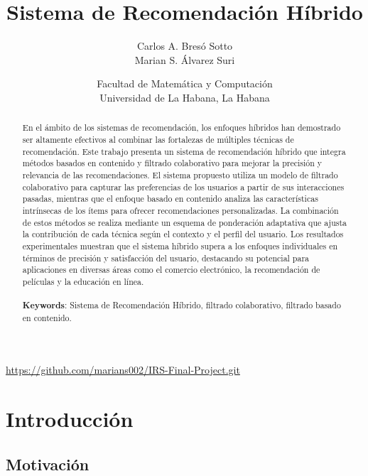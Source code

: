 \documentclass[a4paper,12pt]{report}
\begin{document}
\title{Sistema de Recomendación Híbrido}
\author{Carlos A. Bresó Sotto \\
Marian S. Álvarez Suri}

\urldef{\repo}\url{https://github.com/marians002/IRS-Final-Project.git}

\date{Facultad de Matemática y Computación \\ 
           Universidad de La Habana, La Habana 
           \\ \repo}

\maketitle

\begin{abstract}
    En el ámbito de los sistemas de recomendación, los enfoques híbridos han demostrado ser altamente efectivos al combinar las fortalezas de múltiples técnicas de recomendación. Este trabajo presenta un sistema de recomendación híbrido que integra métodos basados en contenido y filtrado colaborativo para mejorar la precisión y relevancia de las recomendaciones. El sistema propuesto utiliza un modelo de filtrado colaborativo para capturar las preferencias de los usuarios a partir de sus interacciones pasadas, mientras que el enfoque basado en contenido analiza las características intrínsecas de los ítems para ofrecer recomendaciones personalizadas. La combinación de estos métodos se realiza mediante un esquema de ponderación adaptativa que ajusta la contribución de cada técnica según el contexto y el perfil del usuario. Los resultados experimentales muestran que el sistema híbrido supera a los enfoques individuales en términos de precisión y satisfacción del usuario, destacando su potencial para aplicaciones en diversas áreas como el comercio electrónico, la recomendación de películas y la educación en línea.
\\
\\
    \textbf{Keywords}: Sistema de Recomendación Híbrido, filtrado colaborativo, filtrado basado en contenido.
\end{abstract}

\tableofcontents

\chapter{Introducción}
\section{Motivación}
\end{document}
